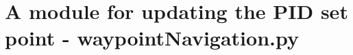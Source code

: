 
\chapter{A module for updating the PID set point - waypointNavigation.py} %

\label{AppendixB} %









